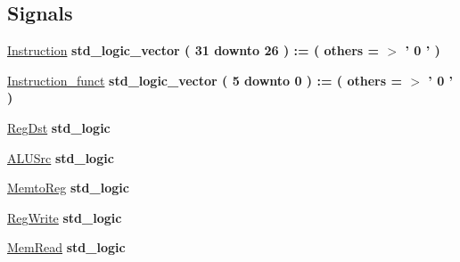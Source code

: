 \subsection*{\-Signals}
 \begin{DoxyCompactItemize}
\item 
\hypertarget{class_control__tb_1_1behavior_a267183c3a03a45e4243b452ca4cefae2}{\hyperlink{class_control__tb_1_1behavior_a267183c3a03a45e4243b452ca4cefae2}{\-Instruction} {\bfseries std\-\_\-logic\-\_\-vector (   31    downto    26  )  \-:= (  others  = $>$ '  0  '  ) } }\label{class_control__tb_1_1behavior_a267183c3a03a45e4243b452ca4cefae2}

\item 
\hypertarget{class_control__tb_1_1behavior_ac4ce8a186b2ce0f689f6fdf434645e8e}{\hyperlink{class_control__tb_1_1behavior_ac4ce8a186b2ce0f689f6fdf434645e8e}{\-Instruction\-\_\-funct} {\bfseries std\-\_\-logic\-\_\-vector (   5    downto    0  )  \-:= (  others  = $>$ '  0  '  ) } }\label{class_control__tb_1_1behavior_ac4ce8a186b2ce0f689f6fdf434645e8e}

\item 
\hypertarget{class_control__tb_1_1behavior_a67c79ca7ea14c50e7b88a92767b7e398}{\hyperlink{class_control__tb_1_1behavior_a67c79ca7ea14c50e7b88a92767b7e398}{\-Reg\-Dst} {\bfseries std\-\_\-logic } }\label{class_control__tb_1_1behavior_a67c79ca7ea14c50e7b88a92767b7e398}

\item 
\hypertarget{class_control__tb_1_1behavior_aecd39ff4850f70b5620d77a1db86c10e}{\hyperlink{class_control__tb_1_1behavior_aecd39ff4850f70b5620d77a1db86c10e}{\-A\-L\-U\-Src} {\bfseries std\-\_\-logic } }\label{class_control__tb_1_1behavior_aecd39ff4850f70b5620d77a1db86c10e}

\item 
\hypertarget{class_control__tb_1_1behavior_a3de014118e9468b5db1181389cd797c1}{\hyperlink{class_control__tb_1_1behavior_a3de014118e9468b5db1181389cd797c1}{\-Memto\-Reg} {\bfseries std\-\_\-logic } }\label{class_control__tb_1_1behavior_a3de014118e9468b5db1181389cd797c1}

\item 
\hypertarget{class_control__tb_1_1behavior_a66398331a595943cc4ff1b585dbe24d9}{\hyperlink{class_control__tb_1_1behavior_a66398331a595943cc4ff1b585dbe24d9}{\-Reg\-Write} {\bfseries std\-\_\-logic } }\label{class_control__tb_1_1behavior_a66398331a595943cc4ff1b585dbe24d9}

\item 
\hypertarget{class_control__tb_1_1behavior_a4bc7da8557faafacddfb56cb3c3f0d73}{\hyperlink{class_control__tb_1_1behavior_a4bc7da8557faafacddfb56cb3c3f0d73}{\-Mem\-Read} {\bfseries std\-\_\-logic } }\label{class_control__tb_1_1behavior_a4bc7da8557faafacddfb56cb3c3f0d73}


\end{DoxyCompactItemize}
